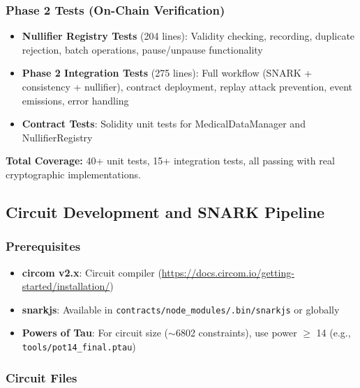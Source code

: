 \subsubsection{Phase 2 Tests (On-Chain Verification)}

\begin{itemize}
    \item \textbf{Nullifier Registry Tests} (204 lines): Validity checking, recording, duplicate rejection, batch operations, pause/unpause functionality
    \item \textbf{Phase 2 Integration Tests} (275 lines): Full workflow (SNARK + consistency + nullifier), contract deployment, replay attack prevention, event emissions, error handling
    \item \textbf{Contract Tests}: Solidity unit tests for MedicalDataManager and NullifierRegistry
\end{itemize}

\textbf{Total Coverage:} 40+ unit tests, 15+ integration tests, all passing with real cryptographic implementations.

\subsection{Circuit Development and SNARK Pipeline}

\subsubsection{Prerequisites}

\begin{itemize}
    \item \textbf{circom v2.x}: Circuit compiler (\url{https://docs.circom.io/getting-started/installation/})
    \item \textbf{snarkjs}: Available in \texttt{contracts/node\_modules/.bin/snarkjs} or globally
    \item \textbf{Powers of Tau}: For circuit size ($\sim$6802 constraints), use power $\geq$ 14 (e.g., \texttt{tools/pot14\_final.ptau})
\end{itemize}

\subsubsection{Circuit Files}

